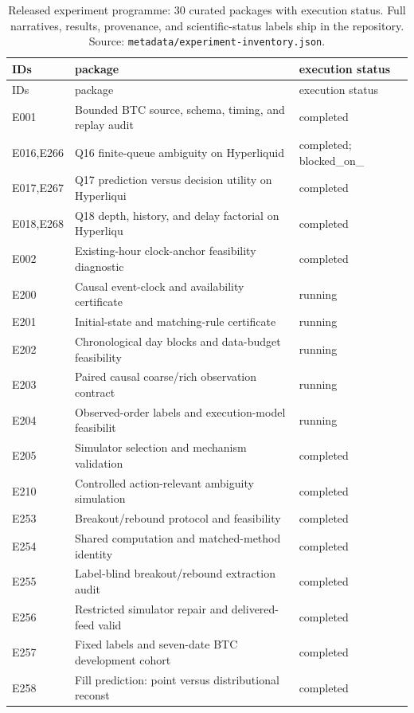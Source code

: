 \begin{longtable}{lp{7.6cm}l}
\caption{Released experiment programme: 30 curated packages with execution status. Full
narratives, results, provenance, and scientific-status labels ship in the repository.
Source: \texttt{metadata/experiment-inventory.json}.}
\label{tab:programme}\\
\toprule
IDs & package & execution status \\
\midrule
\endfirsthead
\toprule
IDs & package & execution status \\
\midrule
\endhead
\bottomrule
\endfoot
E001 & Bounded BTC source, schema, timing, and replay audit & completed \\
E016,E266 & Q16 finite-queue ambiguity on Hyperliquid & completed; blocked\_on\_ \\
E017,E267 & Q17 prediction versus decision utility on Hyperliqui & completed \\
E018,E268 & Q18 depth, history, and delay factorial on Hyperliqu & completed \\
E002 & Existing-hour clock-anchor feasibility diagnostic & completed \\
E200 & Causal event-clock and availability certificate & running \\
E201 & Initial-state and matching-rule certificate & running \\
E202 & Chronological day blocks and data-budget feasibility & running \\
E203 & Paired causal coarse/rich observation contract & running \\
E204 & Observed-order labels and execution-model feasibilit & running \\
E205 & Simulator selection and mechanism validation & completed \\
E210 & Controlled action-relevant ambiguity simulation & completed \\
E253 & Breakout/rebound protocol and feasibility & completed \\
E254 & Shared computation and matched-method identity & completed \\
E255 & Label-blind breakout/rebound extraction audit & completed \\
E256 & Restricted simulator repair and delivered-feed valid & completed \\
E257 & Fixed labels and seven-date BTC development cohort & completed \\
E258 & Fill prediction: point versus distributional reconst & completed \\

\end{longtable}

